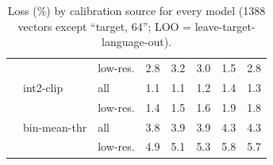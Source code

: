\begin{table}[t]
\begin{tabular}{lllrrrrr}
 &  & low-res. & 2.8 & 3.2 & 3.0 & 1.5 & 2.8 \\
 & int2-clip & all & 1.1 & 1.1 & 1.2 & 1.4 & 1.3 \\
 &  & low-res. & 1.4 & 1.5 & 1.6 & 1.9 & 1.8 \\
 & bin-mean-thr & all & 3.8 & 3.9 & 3.9 & 4.3 & 4.3 \\
 &  & low-res. & 4.9 & 5.1 & 5.3 & 5.8 & 5.7 \\
\bottomrule
\end{tabular}
\caption{Loss (\%) by calibration source for every model (1388 vectors except ``target, 64''; LOO = leave-target-language-out).}\label{tab:calib_full}
\end{table}